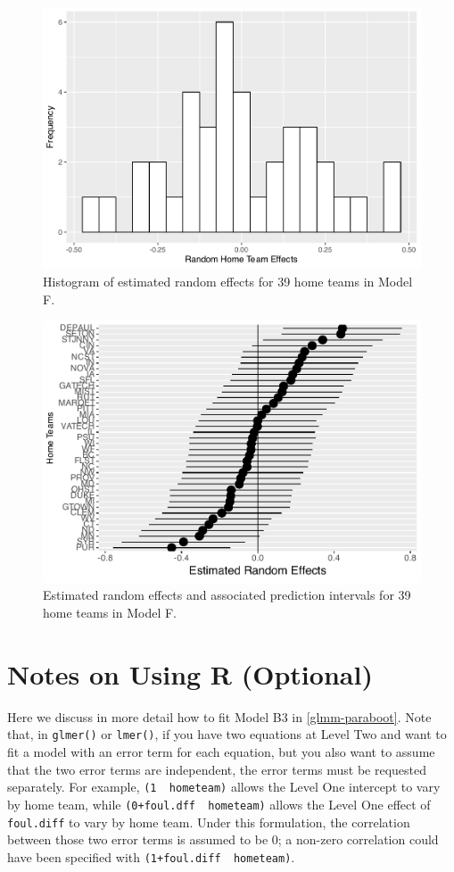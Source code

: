 \documentclass[
]{krantz}
\begin{document}
\begin{figure}

{\centering \includegraphics[width=0.6\linewidth]{bookdown-BeyondMLR_files/figure-latex/gmu-hist1-1} 

}

\caption{Histogram of estimated random effects for 39 home teams in Model F.}\label{fig:gmu-hist1}
\end{figure}

\begin{figure}

{\centering \includegraphics[width=0.6\linewidth]{bookdown-BeyondMLR_files/figure-latex/gmu-cis1-1} 

}

\caption{Estimated random effects and associated prediction intervals for 39 home teams in Model F.}\label{fig:gmu-cis1}
\end{figure}

\hypertarget{usingR-glmm}{%
\section{Notes on Using R (Optional)}\label{usingR-glmm}}

Here we discuss in more detail how to fit Model B3 in \ref{glmm-paraboot}. Note that, in \texttt{glmer()} or \texttt{lmer()}, if you have two equations at Level Two and want to fit a model with an error term for each equation, but you also want to assume that the two error terms are independent, the error terms must be requested separately. For example, \texttt{(1\ \textbar{}\ hometeam)} allows the Level One intercept to vary by home team, while \texttt{(0+foul.dff\ \textbar{}\ hometeam)} allows the Level One effect of \texttt{foul.diff} to vary by home team. Under this formulation, the correlation between those two error terms is assumed to be 0; a non-zero correlation could have been specified with \texttt{(1+foul.diff\ \textbar{}\ hometeam)}.
\end{document}
